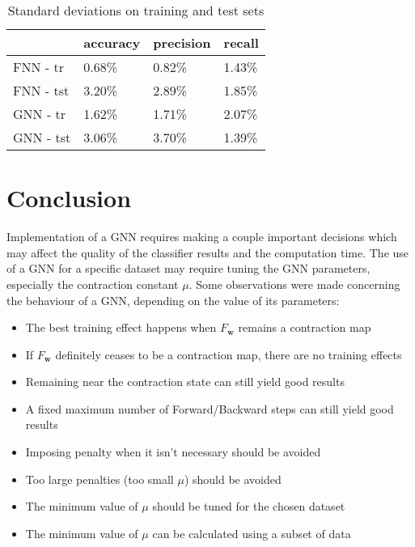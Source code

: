 \documentclass[]{spie}  %
\newcommand{\bm}[1]{\boldsymbol{#1}}
\begin{document}
\begin{table}[h!]
	\begin{center}
	\begin{tabular}{llll}
	\toprule
	& accuracy & precision & recall \\
	\midrule
	FNN - tr &	0.68\% &  0.82\% &  1.43\% \\
	FNN - tst &	3.20\% &  2.89\% &  1.85\% \\
	GNN - tr &	1.62\% &  1.71\% &  2.07\% \\
	GNN - tst &	3.06\% &  3.70\% &  1.39\% \\
	\bottomrule
	\end{tabular}
	\caption{Standard deviations on training and test sets}
	\label{tab:crossstd}
	\end{center}
\end{table}

\section{Conclusion}
Implementation of a GNN requires making a couple important decisions which may affect the quality of the classifier results and the computation time. The use of a GNN for a specific dataset may require tuning the GNN parameters, especially the contraction constant $\mu$. Some observations were made concerning the behaviour of a GNN, depending on the value of its parameters:
\begin{itemize}
	\item The best training effect happens when $F_{\bm{w}}$ remains a contraction map
	\item If $F_{\bm{w}}$ definitely ceases to be a contraction map, there are no training effects
	\item Remaining near the contraction state can still yield good results
	\item A fixed maximum number of Forward/Backward steps can still yield good results
	\item Imposing penalty when it isn't necessary should be avoided
	\item Too large penalties (too small $\mu$) should be avoided
	\item The minimum value of $\mu$ should be tuned for the chosen dataset
	\item The minimum value of $\mu$ can be calculated using a subset of data
\end{itemize}



\end{document}
